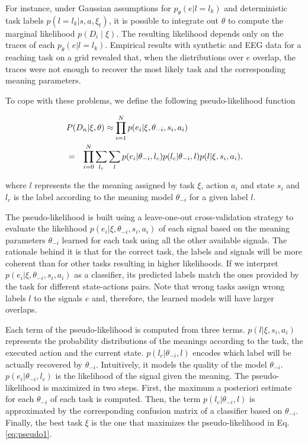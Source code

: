For instance, under Gaussian assumptions for $p_{\theta}(e |l = l_k)$ and deterministic task labels $p(l = l_k| s, a, \xi_t)$, it is possible to integrate out  $\theta$ to compute the marginal likelihood $p(D_i\mid \xi)$. The resulting likelihood depends only on the traces of each $p_{\theta}(e |l = l_k)$. Empirical results with synthetic and EEG data for a reaching task on a grid revealed that, when the distributions over $e$ overlap, the traces were not enough to recover the most likely task and the corresponding meaning parameters. 

To cope with these problems, we define the following pseudo-likelihood function 

\begin{eqnarray}\label{eq:pseudo1}
\lefteqn{P(D_n | \xi, \theta) \approx \prod_{i=1}^N p(e_i | \xi, \theta_{-i},s_i,a_i)}  \\ \label{eq:pseudo2}
&=& \prod_{i=0}^N \sum_{l_c}\sum_l  p(e_i | \theta_{-i}, l_c)  p(l_c | \theta_{-i},l) p(l|\xi,s_i,a_i), 
\label{eq:}
\end{eqnarray}

where $l$ represents the the meaning assigned by task $\xi$, action $a_i$ and state $s_i$ and $l_c$ is the label according to the meaning model $\theta_{-i}$ for a given label $l$.

The pseudo-likelihood is built using a leave-one-out cross-validation strategy to evaluate the likelihood $p(e_i | \xi, \theta_{-i},s_i,a_i)$ of each signal based on the meaning parameters $\theta_{-i}$ learned for each task using all the other available signals. The rationale behind it is that for the correct task, the labels and signals will be more coherent than for other tasks resulting in higher likelihoods. If we interpret $p(e_i | \xi, \theta_{-i},s_i,a_i)$ as a classifier, its predicted labels match the ones provided by the task for different state-actions pairs. Note that wrong tasks assign wrong labels $l$ to the signals $e$ and, therefore, the learned models will have larger overlaps. 

Each term of the pseudo-likelihood is computed from three terms. $p(l|\xi,s_i,a_i)$ represents the probability distributions of the meanings according to the task, the executed action and the current state.   $p(l_c | \theta_{-i},l)$ encodes which label will be actually recovered by $\theta_{-i}$. Intuitively, it models the quality of the model $\theta_{-i}$. $p(e_i | \theta_{-i}, l_c)$ is the likelihood of the signal given the meaning. 
%
The pseudo-likelihood is maximized in two steps. First, the maximum a posteriori estimate for each $\theta_{-i}$ of each task  is computed. Then, the term $p(l_c | \theta_{-i},l)$ is approximated by the corresponding confusion matrix of a classifier based on $\theta_{-i}$. Finally, the best task $\xi$ is the one that maximizes the pseudo-likelihood in Eq. \ref{eq:pseudo1}.

